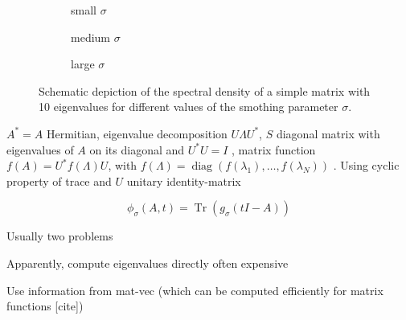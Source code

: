 \begin{figure}[ht]
    \begin{subfigure}[b]{0.33\columnwidth}
        
        \caption{small $\sigma$}
        \label{fig:1-introduction-spectral-density-example-0.01}
    \end{subfigure}
    \begin{subfigure}[b]{0.33\columnwidth}
        
        \caption{medium $\sigma$}
        \label{fig:1-introduction-spectral-density-example-0.02}
    \end{subfigure}
    \begin{subfigure}[b]{0.33\columnwidth}
        
        \caption{large $\sigma$}
        \label{fig:1-introduction-spectral-density-example-0.05}
    \end{subfigure}
    \caption{Schematic depiction of the spectral density of a simple matrix with
    10 eigenvalues for different values of the smothing parameter $\sigma$.}
    \label{fig:1-introduction-smoothened-spectral-density}
\end{figure}

$A^{\ast} = A$ Hermitian,
eigenvalue decomposition $U \Lambda U^{\ast}$,
$S$ diagonal matrix with eigenvalues of $A$ on its diagonal and $U^{\ast} U = I$ \cite[Theorem~4.1.5]{horn1985matrix},
matrix function $f(A) = U^{\ast} f(\Lambda) U$,
with $f(\Lambda) = \operatorname{diag}(f(\lambda_1), \dots, f(\lambda_N))$ \cite[Definition~1.2]{higham2008functions}.
Using cyclic property of trace and $U$ unitary
\gls{identity-matrix}

\begin{equation}
    \phi_{\sigma}(A, t) = \operatorname{Tr}(g_{\sigma}(tI - A)) 
    \label{equ:1-introduction-spectral-density-as-trace}
\end{equation}

Usually two problems

Apparently, compute eigenvalues directly often expensive

Use information from mat-vec (which can be computed efficiently for matrix functions [cite])

